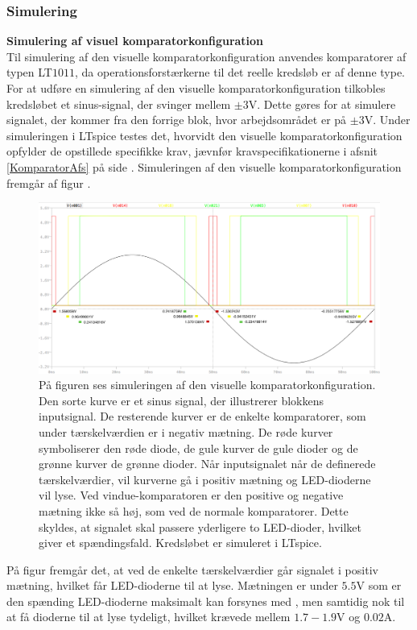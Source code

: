 \subsubsection{Simulering}
\noindent\textbf{Simulering af visuel komparatorkonfiguration} \\
Til simulering af den visuelle komparatorkonfiguration anvendes komparatorer af typen LT$1011$, da operationsforstærkerne til det reelle kredsløb er af denne type. For at udføre en simulering af den visuelle komparatorkonfiguration tilkobles kredsløbet et sinus-signal, der svinger mellem $\pm3$V. Dette gøres for at simulere signalet, der kommer fra den forrige blok, hvor arbejdsområdet er på $\pm3$V. Under simuleringen i LTspice testes det, hvorvidt den visuelle komparatorkonfiguration opfylder de opstillede specifikke krav, jævnfør kravspecifikationerne i afsnit \ref{KomparatorAfs} på side \pageref{KomparatorAfs}. Simuleringen af den visuelle komparatorkonfiguration fremgår af figur . 
\begin{figure}[H]
	\centering
	\includegraphics[scale=0.3]{figures/cProblemloesning/komparator_visuel_simulering_samlet1.PNG}
	\caption{På figuren ses simuleringen af den visuelle komparatorkonfiguration. Den sorte kurve er et sinus signal, der illustrerer blokkens inputsignal. De resterende kurver er de enkelte komparatorer, som under tærskelværdien er i negativ mætning. De røde kurver symboliserer den røde diode, de gule kurver de gule dioder og de grønne kurver de grønne dioder. Når inputsignalet når de definerede tærskelværdier, vil kurverne gå i positiv mætning og LED-dioderne vil lyse. Ved vindue-komparatoren er den positive og negative mætning ikke så høj, som ved de normale komparatorer. Dette skyldes, at signalet skal passere yderligere to LED-dioder, hvilket giver et spændingsfald. Kredsløbet er simuleret i LTspice.}
	\label{fig:komparator_visuel_simulering_samlet}
\end{figure}
På figur  fremgår det, at ved de enkelte tærskelværdier går signalet i positiv mætning, hvilket får LED-dioderne til at lyse. Mætningen er under $5.5$V som er den spænding LED-dioderne maksimalt kan forsynes med  , men samtidig nok til at få dioderne til at lyse tydeligt, hvilket krævede mellem $1.7-1.9$V og $0.02$A. 

